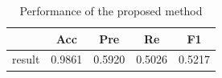 \documentclass[twocolumn]{article}
\begin{document}
        \begin{table}[h]
            \centering
            \begin{tabular}{ccccc}
            \hline
            &Acc&Pre&Re&F1\\
            \hline
            result&0.9861&0.5920&0.5026&0.5217\\
            \hline
            \end{tabular}
            \caption{Performance of the proposed method}
            \label{performance}
            \end{table}
            
    
    
\end{document}
